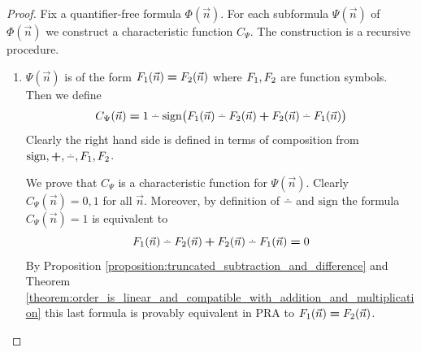 \documentclass[10pt]{amsart}
\newcommand{\meq}{\boldsymbol{=}}
\newcommand{\mplus}{\boldsymbol{+}}
\begin{document}
\begin{proof}
	Fix a quantifier-free formula $\Phi(\vec{n})$. For each subformula $\Psi(\vec{n})$ of $\Phi(\vec{n})$ we construct a characteristic function $C_{\Psi}$. The construction is a recursive procedure.
	\begin{enumerate}[label=\textbf{(\arabic*)}, leftmargin=3.0em]
		\item $\Psi(\vec{n})$ is of the form $F_{\rm{1}}(\vec{n}) \meq F_{\rm{2}}(\vec{n})$ where $F_{\rm{1}},F_{\rm{2}}$ are function symbols. Then we define
		      $$C_{\Psi}(\vec{n}) \meq 1 \dotminus \mathrm{sign}\big(F_{\rm{1}}(\vec{n}) \dotminus F_{\rm{2}}(\vec{n}) \mplus F_{\rm{2}}(\vec{n}) \dotminus F_{\rm{1}}(\vec{n})\big)$$
		      Clearly the right hand side is defined in terms of composition from $\mathrm{sign},\mplus,\dotminus,F_{\rm{1}},F_{\rm{2}}$.

		      We prove that $C_{\Psi}$ is a characteristic function for $\Psi(\vec{n})$. Clearly $C_{\Psi}(\vec{n}) \meq 0,1$ for all $\vec{n}$. Moreover, by definition of $\dotminus$ and $\mathrm{sign}$ the formula $C_{\Psi}(\vec{n}) \meq 1$ is equivalent to
		      $$F_{\rm{1}}(\vec{n}) \dotminus F_{\rm{2}}(\vec{n}) \mplus F_{\rm{2}}(\vec{n}) \dotminus F_{\rm{1}}(\vec{n}) \meq 0$$
		      By Proposition \ref{proposition:truncated_subtraction_and_difference} and Theorem \ref{theorem:order_is_linear_and_compatible_with_addition_and_multiplication} this last formula is provably equivalent in $\mathrm{PRA}$ to $F_{\rm{1}}(\vec{n}) \meq F_{\rm{2}}(\vec{n})$.


\end{enumerate}
\end{proof}
\end{document}
